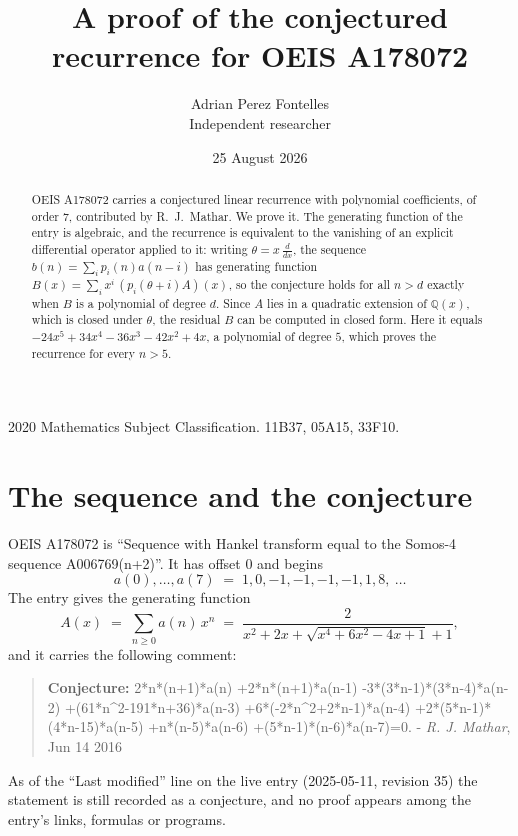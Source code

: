 \documentclass[11pt,a4paper]{article}
\title{A proof of the conjectured recurrence for OEIS A178072}
\author{Adrian Perez Fontelles\\ \small Independent researcher}
\date{25 August 2026}
\theoremstyle{plain}
\theoremstyle{definition}
\begin{document}
\maketitle

\begin{abstract}
OEIS A178072 carries a conjectured linear recurrence with polynomial coefficients, of
order 7, contributed by R.~J.~Mathar. We prove it. The generating function of the
entry is algebraic, and the recurrence is equivalent to the vanishing of an explicit
differential operator applied to it: writing $\theta=x\,\frac{d}{dx}$, the sequence
$b(n)=\sum_{i}p_{i}(n)a(n-i)$ has generating function
$B(x)=\sum_{i}x^{i}\,(p_{i}(\theta+i)A)(x)$, so the conjecture holds for all $n>d$ exactly
when $B$ is a polynomial of degree $d$. Since $A$ lies in a quadratic extension of
$\mathbb{Q}(x)$, which is closed under $\theta$, the residual $B$ can be computed in
closed form. Here it equals $- 24 x^{5} + 34 x^{4} - 36 x^{3} - 42 x^{2} + 4 x$, a polynomial of degree $5$, which proves
the recurrence for every $n>5$.
\end{abstract}

\noindent\small 2020 Mathematics Subject Classification. 11B37, 05A15, 33F10.\normalsize

\section{The sequence and the conjecture}

OEIS A178072 is ``Sequence with Hankel transform equal to the Somos-4 sequence A006769(n+2)''. It has offset $0$ and begins
\[
a(0),\dots,a(7)\;=\;1, 0, -1, -1, -1, -1, 1, 8,\ \dots
\]
The entry gives the generating function
\begin{equation}\label{eq:gf}
A(x)\;=\;\sum_{n\ge 0} a(n)\,x^{n}\;=\;\frac{2}{x^{2} + 2 x + \sqrt{x^{4} + 6 x^{2} - 4 x + 1} + 1} ,
\end{equation}
and it carries the following comment:
\begin{quote}\small
\textbf{Conjecture:} 2*n*(n+1)*a(n) +2*n*(n+1)*a(n-1) -3*(3*n-1)*(3*n-4)*a(n-2) +(61*n\^{}2-191*n+36)*a(n-3) +6*(-2*n\^{}2+2*n-1)*a(n-4) +2*(5*n-1)*(4*n-15)*a(n-5) +n*(n-5)*a(n-6) +(5*n-1)*(n-6)*a(n-7)=0. - \emph{R. J. Mathar}, Jun 14 2016
\end{quote}
As of the ``Last modified'' line on the live entry (2025-05-11, revision 35) the
statement is still recorded as a conjecture, and no proof appears among the entry's links,
formulas or programs.
\end{document}
